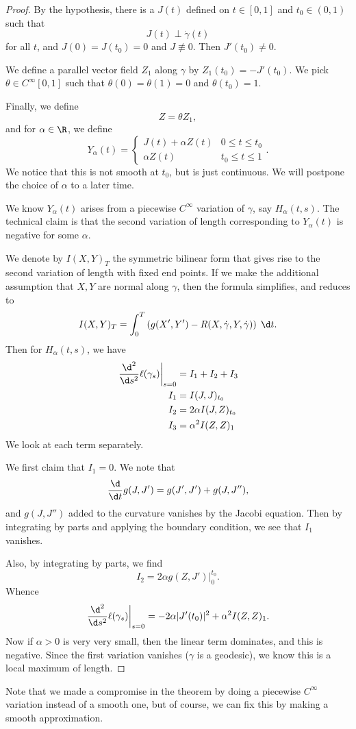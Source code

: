 \documentclass[a4paper]{article}
\begin{document}
\begin{proof}
  By the hypothesis, there is a $J(t)$ defined on $t \in [0, 1]$ and $t_0 \in (0, 1)$ such that
  \[
    J(t) \perp \dot{\gamma}(t)
  \]
  for all $t$, and $J(0) = J(t_0) = 0$ and $J \not\equiv 0$. Then $J'(t_0) \not= 0$.

  We define a parallel vector field $Z_1$ along $\gamma$ by $Z_1(t_0) = -J'(t_0)$. We pick $\theta \in C^\infty[0, 1]$ such that $\theta(0) = \theta(1) = 0$ and $\theta(t_0) = 1$.

  Finally, we define
  \[
    Z = \theta Z_1,
  \]
  and for $\alpha \in \R$, we define
  \[
    Y_\alpha(t) =
    \begin{cases}
      J(t) + \alpha Z(t) & 0 \leq t \leq t_0\\
      \alpha Z(t) & t_0 \leq t \leq 1
    \end{cases}.
  \]
  We notice that this is not smooth at $t_0$, but is just continuous. We will postpone the choice of $\alpha$ to a later time.

  We know $Y_\alpha(t)$ arises from a piecewise $C^\infty$ variation of $\gamma$, say $H_\alpha(t, s)$. The technical claim is that the second variation of length corresponding to $Y_\alpha(t)$ is negative for some $\alpha$.

  We denote by $I(X, Y)_T$ the symmetric bilinear form that gives rise to the second variation of length with fixed end points. If we make the additional assumption that $X, Y$ are normal along $\gamma$, then the formula simplifies, and reduces to
  \[
    I(X, Y)_T = \int_0^T \left(g(X', Y') - R(X, \dot{\gamma}, Y, \dot{\gamma})\right)\;\d t.
  \]
  Then for $H_\alpha(t, s)$, we have
  \begin{align*}
    \left.\frac{\d^2}{\d s^2}\ell(\gamma_s)\right|_{s = 0} &= I_1 + I_2 + I_3\\
    I_1 &= I(J, J)_{t_0}\\
    I_2 &= 2\alpha I(J, Z)_{t_0}\\
    I_3 &= \alpha^2 I(Z, Z)_1
  \end{align*}
  We look at each term separately.

  We first claim that $I_1 = 0$. We note that
  \[
    \frac{\d}{\d t} g(J, J') = g(J', J') + g(J, J''),
  \]
  and $g(J, J'')$ added to the curvature vanishes by the Jacobi equation. Then by integrating by parts and applying the boundary condition, we see that $I_1$ vanishes.

  Also, by integrating by parts, we find
  \[
    I_2 = \left. 2 \alpha g(Z, J') \right|_0^{t_0}.
  \]
  Whence
  \[
    \left.\frac{\d^2}{\d s^2}\ell(\gamma_s)\right|_{s = 0} = -2\alpha |J'(t_0)|^2 + \alpha^2 I(Z, Z)_1.
  \]
  Now if $\alpha > 0$ is very very small, then the linear term dominates, and this is negative. Since the first variation vanishes ($\gamma$ is a geodesic), we know this is a local maximum of length.
\end{proof}
Note that we made a compromise in the theorem by doing a piecewise $C^\infty$ variation instead of a smooth one, but of course, we can fix this by making a smooth approximation.
\end{document}
